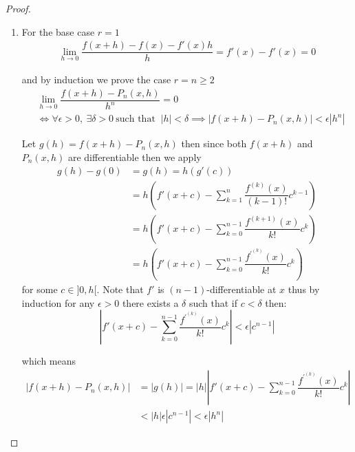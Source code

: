 \begin{proof} \leavevmode
    \begin{enumerate}
        \item
              For the base case \(r = 1\)
              \begin{align*}
                  \lim\limits_{h \to 0}{\dfrac{f(x+h) - f(x) -f'(x)h}{h}} = f'(x) - f'(x) = 0
              \end{align*}

              and by induction we prove the case \(r = n \geq 2\)
              \begin{align*}
                   & \lim\limits_{h \to 0}{\dfrac{f(x+h) - P_n(x,h)}{h^n}} = 0                                                                      \\
                   & \iff \forall \epsilon >0, \ \exists \delta > 0\ \text{such that } \ |h| < \delta \implies |f(x+h) - P_n(x,h)| < \epsilon |h^n|
              \end{align*}

              Let \(g(h) = f(x+h) - P_n(x,h)\) then since both \(f(x+h)\) and \(P_n(x,h)\) are differentiable then we apply 
              \begin{align*}
                  g(h) - g(0) & = g(h) = h(g'(c))                                                   \\
                              & = h(f'(x+c) - \sum_{k = 1}^{n}{\dfrac{f^{(k)}(x)}{(k-1)!}c^{k-1}})  \\
                              & =  h(f'(x+c) - \sum_{k = 0}^{n-1}{\dfrac{f^{(k+1)}(x)}{k!}c^{k}})   \\
                              & =  h(f'(x+c) - \sum_{k = 0}^{n-1}{\dfrac{f^{'^{(k)}}(x)}{k!}c^{k}})
              \end{align*}
              for some \(c \in ]0,h[\). Note that \(f'\) is \((n-1)\)-differentiable at \(x\) thus by induction for any \(\epsilon > 0\) there exists a \(\delta\) such that if \(c < \delta \) then:
              \begin{equation*}
                  |f'(x+c) - \sum_{k = 0}^{n-1}{\dfrac{f^{'^{(k)}}(x)}{k!}c^{k}}| < \epsilon |c^{n-1}|
              \end{equation*}

              which means
              \begin{align*}
                  |f(x+h) - P_n(x,h)| & = |g(h)| = |h| |f'(x+c) - \sum_{k = 0}^{n-1}{\dfrac{f^{'^{(k)}}(x)}{k!}c^{k}}| \\
                                      & < |h| \epsilon |c^{n-1}|< \epsilon |h^n|
              \end{align*}


\end{enumerate}
\end{proof}
